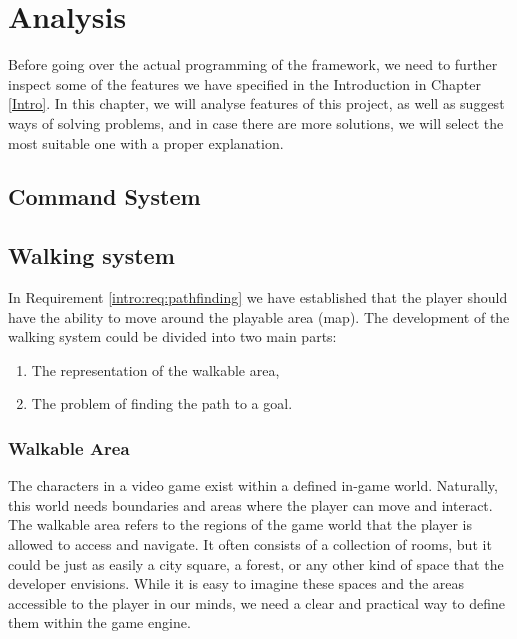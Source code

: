 \chapter{Analysis}

Before going over the actual programming of the framework, we need to further inspect some of the features we have specified in the Introduction in Chapter \ref{Intro}. In this chapter, we will analyse features of this project, as well as suggest ways of solving problems, and in case there are more solutions, we will select the most suitable one with a proper explanation.

\section{Command System}


\section{Walking system}
In Requirement \ref{intro:req:pathfinding}  we have established that the player should have the ability to move around the playable area (map). The development of the walking system could be divided into two main parts:
\begin{enumerate}
    \item The representation of the walkable area,
    \item The problem of finding the path to a goal.
\end{enumerate} 

\subsection{Walkable Area}
\label{analysis:walkableMap}

The characters in a video game exist within a defined in-game world. Naturally, this world needs boundaries and areas where the player can move and interact. The walkable area refers to the regions of the game world that the player is allowed to access and navigate. It often consists of a collection of rooms, but it could be just as easily a city square, a forest, or any other kind of space that the developer envisions. While it is easy to imagine these spaces and the areas accessible to the player in our minds, we need a clear and practical way to define them within the game engine. 

